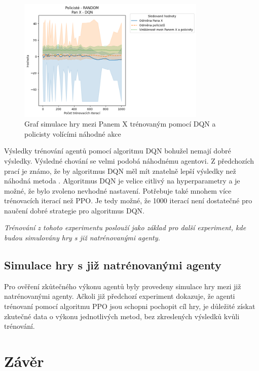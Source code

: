 \begin{figure}[H]\label{fig:cop_random_mrx_dqn}
	\centering
	\includegraphics[width=0.8\textwidth]{obrazky-figures/graphs/cop_RANDOM_mrx_DQN.png}
	\caption{Graf simulace hry mezi Panem X trénovaným pomocí DQN a policisty volícími náhodné akce}
\end{figure}

Výsledky trénování agentů pomocí algoritmu DQN bohužel nemají dobré výsledky.
Výsledné chování se velmi podobá náhodnému agentovi.
Z předchozích prací je známo, že by algoritmus DQN měl mít znatelně lepší výsledky než náhodná metoda \cite{Hrklova2023thesis}.
Algoritmus DQN je velice citlivý na hyperparametry a je možné, že bylo zvoleno nevhodné nastavení.
Potřebuje také mnohem více trénovacích iterací než PPO\@.
Je tedy možné, že 1000 iterací není dostatečné pro naučení dobré strategie pro algoritmus DQN.

\emph{Trénování z tohoto experimentu poslouží jako základ pro další experiment, kde budou simulovány hry s již natrénovanými agenty.}

\section{Simulace hry s již natrénovanými agenty}

Pro ověření zkůtečného výkonu agentů byly provedeny simulace hry mezi již natrénovanými agenty.
Ačkoli již předchozí experiment dokazuje, že agenti trénovaní pomocí algoritmu PPO jsou schopni pochopit cíl hry, je důležité získat zkutečné data o výkonu jednotlivých metod, bez zkreslených výsledků kvůli trénování.



\chapter{Závěr}
\label{ch:zaver}

